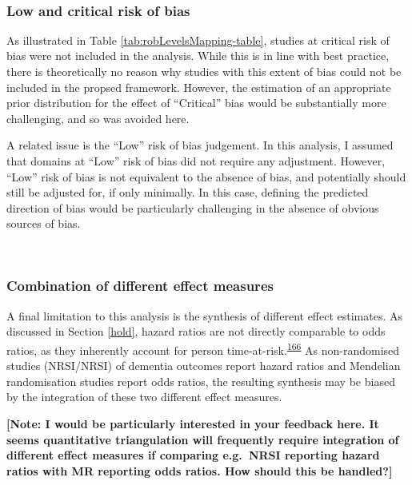 \documentclass[a4paper, twoside]{templates/ociamthesis}
\begin{document}
~

\hypertarget{low-and-critical-risk-of-bias}{%
\subsubsection{Low and critical risk of bias}\label{low-and-critical-risk-of-bias}}

As illustrated in Table \ref{tab:robLevelsMapping-table}, studies at critical risk of bias were not included in the analysis. While this is in line with best practice, there is theoretically no reason why studies with this extent of bias could not be included in the propsed framework. However, the estimation of an appropriate prior distribution for the effect of ``Critical'' bias would be substantially more challenging, and so was avoided here.

A related issue is the ``Low'' risk of bias judgement. In this analysis, I assumed that domains at ``Low'' risk of bias did not require any adjustment. However, ``Low'' risk of bias is not equivalent to the absence of bias, and potentially should still be adjusted for, if only minimally. In this case, defining the predicted direction of bias would be particularly challenging in the absence of obvious sources of bias.

~

\hypertarget{combination-of-different-effect-measures}{%
\subsubsection{Combination of different effect measures}\label{combination-of-different-effect-measures}}

A final limitation to this analysis is the synthesis of different effect estimates. As discussed in Section \ref{hold}, hazard ratios are not directly comparable to odds ratios, as they inherently account for person time-at-risk.\textsuperscript{\protect\hyperlink{ref-mckenzie2019}{166}} As non-randomised studies (NRSI/NRSI) of dementia outcomes report hazard ratios and Mendelian randomisation studies report odds ratios, the resulting synthesis may be biased by the integration of these two different effect measures.

\textbf{{[}Note: I would be particularly interested in your feedback here. It seems quantitative triangulation will frequently require integration of different effect measures if comparing e.g.~NRSI reporting hazard ratios with MR reporting odds ratios. How should this be handled?{]}}
\end{document}
